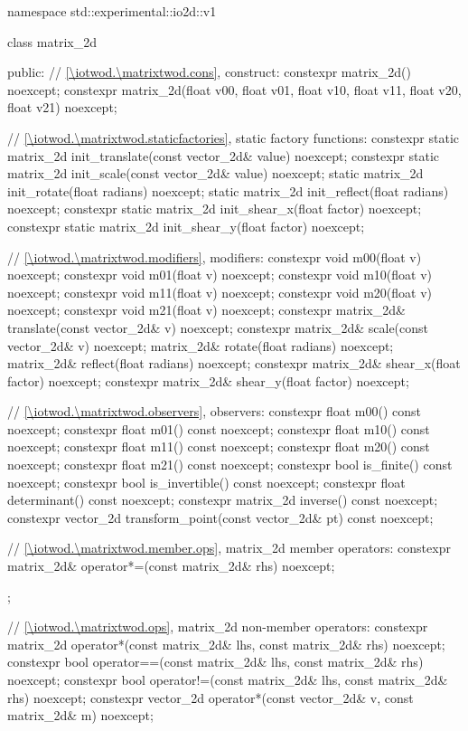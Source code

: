 \begin{codeblock}
namespace std::experimental::io2d::v1 {
  class matrix_2d {
  public:
    // \ref{\iotwod.\matrixtwod.cons}, construct:
    constexpr matrix_2d() noexcept;
    constexpr matrix_2d(float v00, float v01, float v10, float v11,
      float v20, float v21) noexcept;
    
    // \ref{\iotwod.\matrixtwod.staticfactories}, static factory functions:
    constexpr static matrix_2d init_translate(const vector_2d& value) noexcept;
    constexpr static matrix_2d init_scale(const vector_2d& value) noexcept;
    static matrix_2d init_rotate(float radians) noexcept;
    static matrix_2d init_reflect(float radians) noexcept;
    constexpr static matrix_2d init_shear_x(float factor) noexcept;
    constexpr static matrix_2d init_shear_y(float factor) noexcept;
    
    // \ref{\iotwod.\matrixtwod.modifiers}, modifiers:
    constexpr void m00(float v) noexcept;
    constexpr void m01(float v) noexcept;
    constexpr void m10(float v) noexcept;
    constexpr void m11(float v) noexcept;
    constexpr void m20(float v) noexcept;
    constexpr void m21(float v) noexcept;
    constexpr matrix_2d& translate(const vector_2d& v) noexcept;
    constexpr matrix_2d& scale(const vector_2d& v) noexcept;
    matrix_2d& rotate(float radians) noexcept;
    matrix_2d& reflect(float radians) noexcept;
    constexpr matrix_2d& shear_x(float factor) noexcept;
    constexpr matrix_2d& shear_y(float factor) noexcept;
    
    // \ref{\iotwod.\matrixtwod.observers}, observers:
    constexpr float m00() const noexcept;
    constexpr float m01() const noexcept;
    constexpr float m10() const noexcept;
    constexpr float m11() const noexcept;
    constexpr float m20() const noexcept;
    constexpr float m21() const noexcept;
    constexpr bool is_finite() const noexcept;
    constexpr bool is_invertible() const noexcept;
    constexpr float determinant() const noexcept;
    constexpr matrix_2d inverse() const noexcept;
    constexpr vector_2d transform_point(const vector_2d& pt) const noexcept;
    
    // \ref{\iotwod.\matrixtwod.member.ops}, matrix_2d member operators:
    constexpr matrix_2d& operator*=(const matrix_2d& rhs) noexcept;
  };
    
  // \ref{\iotwod.\matrixtwod.ops}, matrix_2d non-member operators:
  constexpr matrix_2d operator*(const matrix_2d& lhs, const matrix_2d& rhs)
    noexcept;
  constexpr bool operator==(const matrix_2d& lhs, const matrix_2d& rhs)
    noexcept;
  constexpr bool operator!=(const matrix_2d& lhs, const matrix_2d& rhs)
    noexcept;
  constexpr vector_2d operator*(const vector_2d& v, const matrix_2d& m) 
    noexcept;
}
\end{codeblock}

